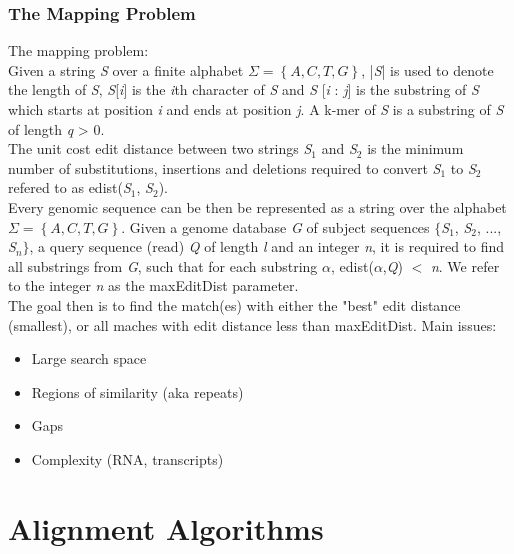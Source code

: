 \documentclass[pdf]{beamer}
\begin{document}
\begin{frame}[allowframebreaks]
\frametitle{The Mapping Problem}
The mapping problem:\\
\vspace{0.1in}
Given a string \textit{S} over a finite alphabet $\Sigma = \left\{A,C,T,G\right\}$, |\textit{S}| is used to
denote the length of \textit{S}, \textit{S}[\textit{i}] is the \textit{i}th character of \textit{S} and \textit{S} [\textit{i} : \textit{j}] is the substring
of \textit{S} which starts at position \textit{i} and ends at position \textit{j}. A k-mer of \textit{S} is a
substring of \textit{S} of length \textit{q} > 0.\\
\vspace{0.1in}
The unit cost edit distance between two strings \textit{S}$_1$ and \textit{S}$_2$ is the minimum number of
substitutions, insertions and deletions required to convert
\textit{S}$_1$ to \textit{S}$_2$ refered to as edist(\textit{S}$_1$, \textit{S}$_2$).\\
\vspace{0.1in}
Every genomic sequence can be then be represented as a string over the alphabet $\Sigma = \left\{A,C,T,G\right\}$.
Given a genome database \textit{G} of subject sequences $\{$\textit{S}$_1$, \textit{S}$_2$, ..., \textit{S}$_n\}$,
a query sequence (read) \textit{Q} of length \textit{l} and an integer \textit{n}, it is required to
find all substrings from \textit{G}, such that for each substring $\alpha$, edist($\alpha$,\textit{Q}) $<$ \textit{n}.
We refer to the integer \textit{n} as the maxEditDist parameter.\\
\vspace{0.1in}
The goal then is to find the match(es) with either the "best" edit distance (smallest), or all maches with edit distance less than maxEditDist.
\vspace{0.1in}
Main issues:\\
\vspace{0.1in}
\begin{itemize}
\item Large search space
\item Regions of similarity (aka repeats)
\item Gaps
\item Complexity (RNA, transcripts)
\end{itemize}
\end{frame}

\section{Alignment Algorithms}
\end{document}
